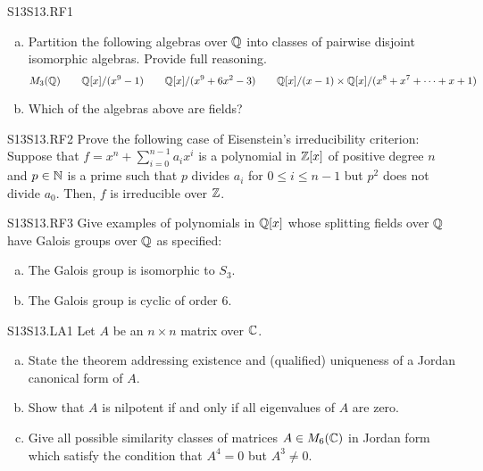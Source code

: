 \documentclass[../AlgebraQualSolutions.tex]{subfiles}
\begin{document}
\begin{prob}{S13}{S13.RF1}

	\begin{enumerate}[(a)]
		\item Partition the following algebras over $\mathbb{Q}$ into classes of pairwise disjoint isomorphic algebras. Provide full reasoning.
			\[M_3(\mathbb{Q}) \quad  \quad \mathbb{Q}[x]/(x^9 - 1) \quad \quad \mathbb{Q}[x]/(x^9 + 6x^2 - 3) \quad  \quad \mathbb{Q}[x]/(x-1) \times \mathbb{Q}[x]/(x^8 + x^7 + \cdots + x + 1)\]
		\item Which of the algebras above are fields?
	\end{enumerate}
\end{prob}

\begin{prob}{S13}{S13.RF2}
	Prove the following case of Eisenstein's irreducibility criterion: Suppose that $f = x^n + \sum_{i=0}^{n-1} a_i x^i$ is a polynomial in $\mathbb{Z}[x]$ of positive degree $n$ and $p \in \mathbb{N}$ is a prime such that $p$ divides $a_i$ for $0 \leq i \leq n - 1$ but $p^2$ does not divide $a_0$. Then, $f$ is irreducible over $\mathbb{Z}$.
\end{prob}

\begin{prob}{S13}{S13.RF3}
Give examples of polynomials in $\mathbb{Q}[x]$ whose splitting fields over $\mathbb{Q}$ have Galois groups over $\mathbb{Q}$ as specified:
	\begin{enumerate}[(a)]
		\item The Galois group is isomorphic to $S_3$.
		\item The Galois group is cyclic of order 6.
	\end{enumerate}
\end{prob}

\begin{prob}{S13}{S13.LA1}
Let $A$ be an $n \times n$ matrix over $\mathbb{C}$.
	\begin{enumerate}[(a)]
		\item State the theorem addressing existence and (qualified) uniqueness of a Jordan canonical form of $A$.
		\item Show that $A$ is nilpotent if and only if all eigenvalues of $A$ are zero.
		\item Give all possible similarity classes of matrices $A \in M_6(\mathbb{C})$ in Jordan form which satisfy the condition that  $A^4 = 0$ but $A^3 \neq 0$.
	\end{enumerate}
\end{prob}
\end{document}
